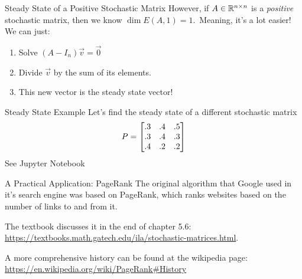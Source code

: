 \documentclass[xcoler=dvipsnames, aspectratio=169]{beamer}
\begin{document}
    \begin{frame}{Steady State of a Positive Stochastic Matrix}
        However, if $A\in\mathbb{R}^{n\times n}$ is a \emph{positive} stochastic matrix, then we know 
        $\dim{E(A,1)} = 1$.\pause\ Meaning, it's a lot easier! We can just:
        \begin{enumerate}
            \pause\item Solve $(A-I_n)\vec{v}=\vec{0}$
            \pause\item Divide $\vec{v}$ by the sum of its elements.
            \pause\item This new vector is the steady state vector!
        \end{enumerate}
    \end{frame}
    \begin{frame}{Steady State Example}
        Let's find the steady state of a different stochastic matrix
        \[
            P = \begin{bmatrix}
                .3 & .4 & .5\\
                .3 & .4 & .3\\
                .4 & .2 & .2
            \end{bmatrix}
        \]
        See Jupyter Notebook
    \end{frame}
    \begin{frame}{A Practical Application: PageRank}
        The original algorithm that Google used in it's search engine was based on PageRank, which 
        ranks websites based on the number of links to and from it.

        \vspace{10pt}

        The textbook discusses it in the end of chapter 5.6: \url{https://textbooks.math.gatech.edu/ila/stochastic-matrices.html}. 

        \vspace{10pt}

        A more comprehensive history can be found at the wikipedia page: \url{https://en.wikipedia.org/wiki/PageRank\#History}
    \end{frame}
\end{document}
